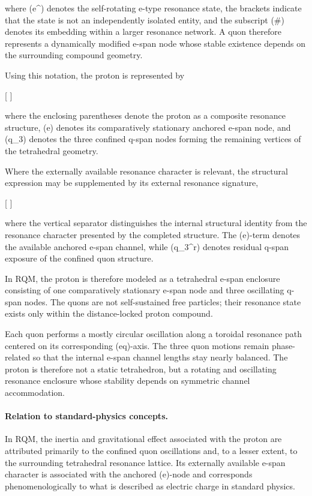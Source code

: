 \documentclass[11pt,a4paper]{article}
\begin{document}
where (e^{\circlearrowright}) denotes the self-rotating e-type resonance state, the brackets indicate that the state is not an independently isolated entity, and the subscript (#) denotes its embedding within a larger resonance network. A quon therefore represents a dynamically modified e-span node whose stable existence depends on the surrounding compound geometry.

Using this notation, the proton is represented by

[
]

where the enclosing parentheses denote the proton as a composite resonance structure, (e) denotes its comparatively stationary anchored e-span node, and (q_3) denotes the three confined q-span nodes forming the remaining vertices of the tetrahedral geometry.

Where the externally available resonance character is relevant, the structural expression may be supplemented by its external resonance signature,

[
]

where the vertical separator distinguishes the internal structural identity from the resonance character presented by the completed structure. The (e)-term denotes the available anchored e-span channel, while (q_3^{r}) denotes residual q-span exposure of the confined quon structure.

In RQM, the proton is therefore modeled as a tetrahedral e-span enclosure consisting of one comparatively stationary e-span node and three oscillating q-span nodes. The quons are not self-sustained free particles; their resonance state exists only within the distance-locked proton compound.

Each quon performs a mostly circular oscillation along a toroidal resonance path centered on its corresponding (eq)-axis. The three quon motions remain phase-related so that the internal e-span channel lengths stay nearly balanced. The proton is therefore not a static tetrahedron, but a rotating and oscillating resonance enclosure whose stability depends on symmetric channel accommodation.


\paragraph{Relation to standard-physics concepts.}
In RQM, the inertia and gravitational effect associated with the proton are attributed primarily to the confined quon oscillations and, to a lesser extent, to the surrounding tetrahedral resonance lattice. Its externally available e-span character is associated with the anchored (e)-node and corresponds phenomenologically to what is described as electric charge in standard physics.
\end{document}
